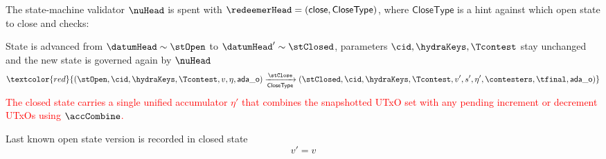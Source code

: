 \noindent The state-machine validator $\nuHead$ is spent with
$\redeemerHead = (\mathsf{close}, \mathsf{CloseType})$, where
$\mathsf{CloseType}$ is a hint against which open state to close and checks:
\begin{menumerate}
	\item State is advanced from $\datumHead \sim \stOpen$ to
	$\datumHead' \sim \stClosed$, parameters $\cid,\hydraKeys,\Tcontest$
	stay unchanged and the new state is governed again by $\nuHead$
	\[
		\textcolor{red}{(\stOpen,\cid,\hydraKeys,\Tcontest,v,\eta,\mathsf{ada\_o}) \xrightarrow[\mathsf{CloseType}]{\stClose} (\stClosed,\cid,\hydraKeys,\Tcontest,v',s',\eta', \contesters,\tfinal,\mathsf{ada\_o})}
	\]
	\textcolor{red}{The closed state carries a single unified accumulator $\eta'$ that combines the snapshotted UTxO set with any pending increment or decrement UTxOs using $\accCombine$.}
	\item Last known open state version is recorded in closed state
	\[
		v' = v
	\]


\end{menumerate}
